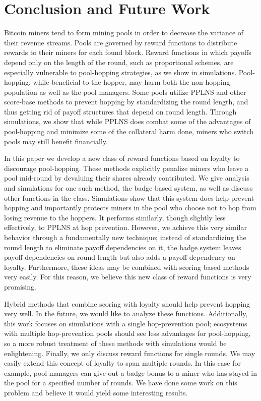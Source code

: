 \documentclass{article}
\theoremstyle{plain}
\theoremstyle{definition}
\begin{document}
\section{Conclusion and Future Work}
Bitcoin miners tend to form mining pools in order to decrease the variance of their revenue streams. Pools are governed by reward functions to distribute rewards to their miners for each found block. Reward functions in which payoffs depend only on the length of the round, such as proportional schemes, are especially vulnerable to pool-hopping strategies, as we show in simulations. Pool-hopping, while beneficial to the hopper, may harm both the non-hopping population as well as the pool managers. Some pools utilize PPLNS and other score-base methods to prevent hopping by standardizing the round length, and thus getting rid of payoff structures that depend on round length. Through simulations, we show that while PPLNS does combat some of the advantages of pool-hopping and minimize some of the collateral harm done, miners who switch pools may still benefit financially. 

In this paper we develop a new class of reward functions based on loyalty to discourage pool-hopping. These methods explicitly penalize miners who leave a pool mid-round by devaluing their shares already contributed. We give analysis and simulations for one such method, the badge based system, as well as discuss other functions in the class. Simulations show that this system does help prevent hopping and importantly protects miners in the pool who choose not to hop from losing revenue to the hoppers. It performs similarly, though slightly less effectively, to PPLNS at hop prevention. However, we achieve this very similar behavior through a fundamentally new technique; instead of standardizing the round length to eliminate payoff dependencies on it, the badge system leaves payoff dependencies on round length but also adds a payoff dependency on loyalty. Furthermore, these ideas may be combined with scoring based methods very easily. For this reason, we believe this new class of reward functions is very promising. 

Hybrid methods that combine scoring with loyalty should help prevent hopping very well. In the future, we would like to analyze these functions. Additionally, this work focuses on simulations with a single hop-prevention pool; ecosystems with multiple hop-prevention pools should see less advantages for pool-hopping, so a more robust treatment of these methods with simulations would be enlightening. Finally, we only discuss reward functions for single rounds. We may easily extend this concept of loyalty to span multiple rounds. In this case for example, pool managers can give out a badge bonus to a miner who has stayed in the pool for a specified number of rounds. We have done some work on this problem and believe it would yield some interesting results.



\end{document}
